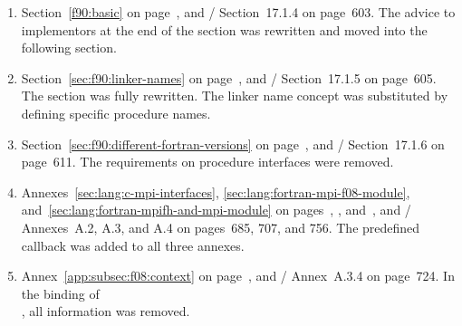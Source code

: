 \begin{enumerate}
\item 
Section~\ref{f90:basic} on page~\pageref{f90:basic}, and
\MPIIIIDOTO/ Section~17.1.4 on page~603.
\newline 
The advice to implementors at the end of the section was rewritten and moved into the following section.

\item 
Section~\ref{sec:f90:linker-names} on page~\pageref{sec:f90:linker-names}, and
\MPIIIIDOTO/ Section~17.1.5 on page~605.
\newline 
The section was fully rewritten. The linker name concept was substituted by defining specific procedure names.

\item 
Section~\ref{sec:f90:different-fortran-versions} on page~\pageref{sec:f90:different-fortran-versions}, and
\MPIIIIDOTO/ Section~17.1.6 on page~611.
\newline 
The requirements on  procedure interfaces were removed. 

\item 
Annexes~\ref{sec:lang:c-mpi-interfaces}, \ref{sec:lang:fortran-mpi-f08-module}, and~\ref{sec:lang:fortran-mpifh-and-mpi-module}
on pages~\pageref{sec:lang:c-mpi-interfaces}, \pageref{sec:lang:fortran-mpi-f08-module}, and~\pageref{sec:lang:fortran-mpifh-and-mpi-module}, and
\newline 
\MPIIIIDOTO/ Annexes~A.2, A.3, and A.4 on pages~685, 707, and 756.
\newline 
The predefined callback  was added to all three annexes.

\item 
{\raggedright
Annex~\ref{app:subsec:f08:context} on page~\pageref{app:subsec:f08:context}, and
\MPIIIIDOTO/ Annex~A.3.4 on page~724.
\newline 
In the  binding 
%
%
%
%
%
%
%
%
%
of\\
,
all  information was removed.

}
\end{enumerate}

